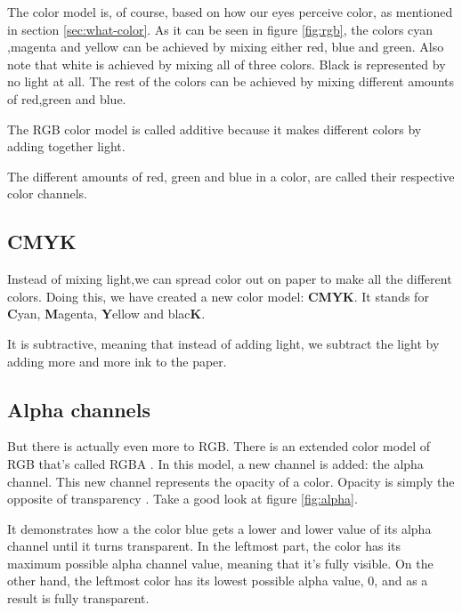 \begin{refsection}
  The color model is, of course, based on how our eyes perceive color,
  as mentioned in section \ref{sec:what-color}. As it can be seen in
  figure \ref{fig:rgb}, the colors cyan ,magenta and yellow can
  be achieved by mixing either red, blue and green. Also note that
  white is achieved by mixing all of three colors. Black is
  represented by no light at all. The rest of the colors can be
  achieved by mixing different amounts of red,green and blue.

  The RGB color model is called additive
  because it makes different colors by adding together light.

  The different amounts of red, green and blue in a color, are called
  their respective color channels.

  \subsection{CMYK}
  \label{sec:cmyk}

  Instead of mixing light,we can spread color out on paper to make all
  the different colors. Doing this, we have created a new color model:
  \textbf{CMYK}. It stands for \textbf{C}yan,
  \textbf{M}agenta, \textbf{Y}ellow and blac\textbf{K}.

  It is subtractive, meaning that
  instead of adding light, we subtract the light by adding more and
  more ink to the paper.

  \subsection{Alpha channels}
  \label{sec:alpha_chan}

  But there is actually even more to RGB. There is an extended color
  model of RGB that's called RGBA . In this model, a new channel is
  added: the alpha channel. This new channel
  represents the opacity of a color. Opacity is simply the opposite of
  transparency \cite{porter84_compos_dig_img}. Take
  a good look at figure \ref{fig:alpha}.

  It demonstrates how a the color blue gets a lower and lower value of
  its alpha channel until it turns transparent. In the leftmost part,
  the color has its maximum possible alpha channel value, meaning that it's
  fully visible. On the other hand, the leftmost color has its lowest
  possible alpha value, $0$, and as a result is fully transparent.


\end{refsection}
